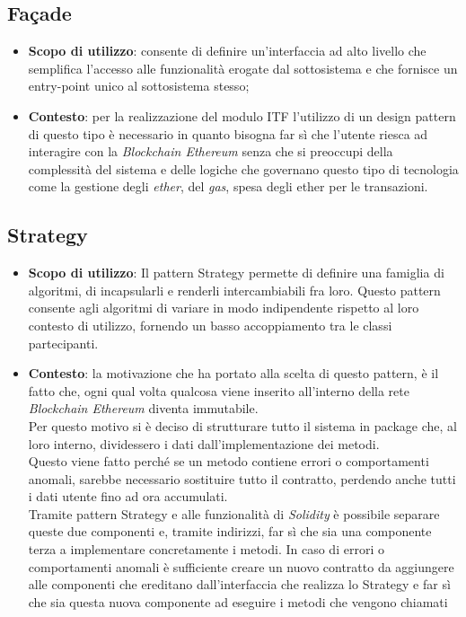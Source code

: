 \subsection{Façade}
\begin{itemize}
	\item \textbf{Scopo di utilizzo}: consente di definire un'interfaccia ad alto livello che semplifica l'accesso alle funzionalità erogate dal sottosistema e che fornisce un entry-point unico al sottosistema stesso;
	\item \textbf{Contesto}: per la realizzazione del modulo \gls{ITF} l'utilizzo di un design pattern di questo tipo è necessario in quanto bisogna far sì che l'utente riesca ad interagire con la \textit{Blockchain Ethereum} senza che si preoccupi della complessità del sistema e delle logiche che governano questo tipo di tecnologia come la gestione degli \emph{\gls{ether}}\glsfirstoccur, del \emph{\gls{gas}}\glsfirstoccur, spesa degli \gls{ether} per le transazioni.
\end{itemize}
\subsection{Strategy}
\begin{itemize}
	\item \textbf{Scopo di utilizzo}: Il pattern Strategy permette di definire una famiglia di algoritmi, di incapsularli e renderli intercambiabili fra loro. Questo pattern consente agli algoritmi di variare in modo indipendente rispetto al loro contesto di utilizzo, fornendo un basso accoppiamento tra le classi partecipanti.
	\item \textbf{Contesto}: la motivazione che ha portato alla scelta di questo pattern, è il fatto che, ogni qual volta qualcosa viene inserito all'interno della rete \textit{Blockchain Ethereum} diventa immutabile.\\
	Per questo motivo si è deciso di strutturare tutto il sistema in package che, al loro interno, dividessero i dati dall'implementazione dei metodi.\\
	Questo viene fatto perché se un metodo contiene errori o comportamenti anomali, sarebbe necessario sostituire tutto il contratto, perdendo anche tutti i dati utente fino ad ora accumulati.\\
	Tramite pattern Strategy e alle funzionalità di \textit{Solidity} è possibile separare queste due componenti e, tramite indirizzi, far sì che sia una componente terza a implementare concretamente i metodi.
	In caso di errori o comportamenti anomali è sufficiente creare un nuovo contratto da aggiungere alle componenti che ereditano dall'interfaccia che realizza lo Strategy e far sì che sia questa nuova componente ad eseguire i metodi che vengono chiamati	
\end{itemize}
